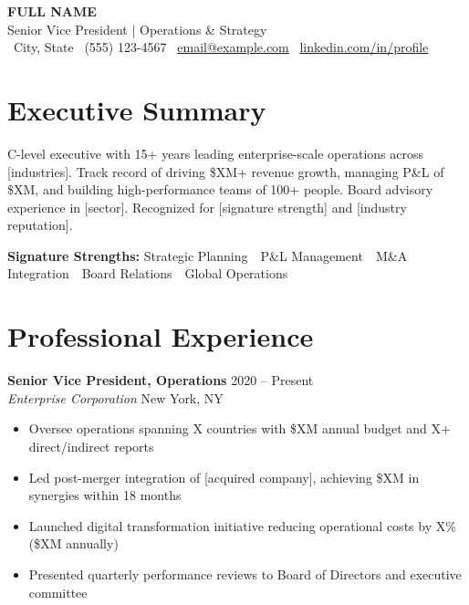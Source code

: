 \documentclass[11pt,a4paper]{article}
\newcommand{\entry}[4]{%
    \noindent\textbf{#1} \hfill {\small #2} \\
    \textit{#3} \hfill {\small #4}%
}
\begin{document}
\begin{center}
    {\LARGE\bfseries\color{navy} FULL NAME} \\[0.2em]
    {\large Senior Vice President | Operations \& Strategy} \\[0.4em]
    {\small \faMapMarker*\ City, State \quad\textbar\quad \faPhone*\ (555) 123-4567 \quad\textbar\quad \faEnvelope\ \href{mailto:email@example.com}{email@example.com} \quad\textbar\quad \faLinkedin\ \href{https://linkedin.com/in/profile}{linkedin.com/in/profile}}
\end{center}

\section{Executive Summary}

C-level executive with 15+ years leading enterprise-scale operations across [industries]. Track record of driving \$XM+ revenue growth, managing P\&L of \$XM, and building high-performance teams of 100+ people. Board advisory experience in [sector]. Recognized for [signature strength] and [industry reputation].

\vspace{0.3em}
\noindent\textbf{Signature Strengths:} Strategic Planning \,\textbar\, P\&L Management \,\textbar\, M\&A Integration \,\textbar\, Board Relations \,\textbar\, Global Operations

\section{Professional Experience}

\entry{Senior Vice President, Operations}{2020 -- Present}{Enterprise Corporation}{New York, NY}
\begin{itemize}[leftmargin=1.5em, itemsep=0.2em, topsep=0.3em]
    \item Oversee operations spanning X countries with \$XM annual budget and X+ direct/indirect reports
    \item Led post-merger integration of [acquired company], achieving \$XM in synergies within 18 months
    \item Launched digital transformation initiative reducing operational costs by X\% (\$XM annually)
    \item Presented quarterly performance reviews to Board of Directors and executive committee
\end{itemize}
\end{document}
